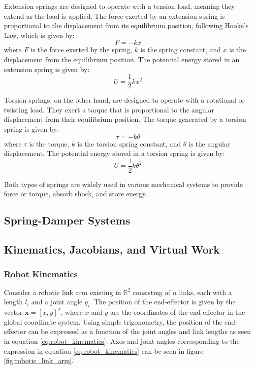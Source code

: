 Extension springs are designed to operate with a tension load, meaning they extend as the load is applied. The force exerted by an extension spring is proportional to the displacement from its equilibrium position, following Hooke's Law, which is given by:
\begin{equation}
    F = -kx
\end{equation}
where \( F \) is the force exerted by the spring, \( k \) is the spring constant, and \( x \) is the displacement from the equilibrium position. The potential energy stored in an extension spring is given by:
\begin{equation}
    U = \frac{1}{2}kx^2
\end{equation}

Torsion springs, on the other hand, are designed to operate with a rotational or twisting load. They exert a torque that is proportional to the angular displacement from their equilibrium position. The torque generated by a torsion spring is given by:
\begin{equation}
    \tau = -k\theta
\end{equation}
where \( \tau \) is the torque, \( k \) is the torsion spring constant, and \( \theta \) is the angular displacement. The potential energy stored in a torsion spring is given by:
\begin{equation}
    U = \frac{1}{2}k\theta^2
\end{equation}

Both types of springs are widely used in various mechanical systems to provide force or torque, absorb shock, and store energy.

\subsection{Spring-Damper Systems}

\subsection{Kinematics, Jacobians, and Virtual Work}
    \subsubsection{Robot Kinematics}
    \label{sec:robot_kinematics}
Consider a robotic link arm existing in $\mathbb{R}^2$ consisting of $n$ links, each with a length $l_i$ and a joint angle $q_i$. The position of the end-effector is given by the vector $\mathbf{x} = [x, y]^T$, where $x$ and $y$ are the coordinates of the end-effector in the global coordinate system. Using simple trigonometry, the position of the end-effector can be expressed as a function of the joint angles and link lengths as seen in equation \ref{eq:robot_kinematics}. 
Axes and joint angles corresponding to the expression in equation \ref{eq:robot_kinematics} can be seen in figure \ref{fig:robotic_link_arm}. 

